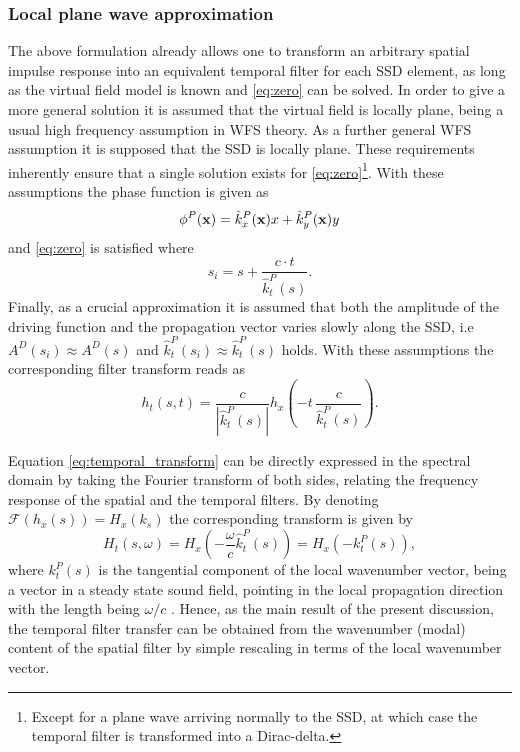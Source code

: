 \documentclass[conference]{IEEEtran}
\begin{document}
\subsubsection{Local plane wave approximation}
The above formulation already allows one to transform an arbitrary spatial impulse response into an equivalent temporal filter for each SSD element, as long as the virtual field model is known and \eqref{eq:zero} can be solved.
In order to give a more general solution it is assumed that the virtual field is locally plane, being a usual high frequency assumption in WFS theory.
As a further general WFS assumption it is supposed that the SSD is locally plane.
These requirements inherently ensure that a single solution exists for \eqref{eq:zero}\footnote{Except for a plane wave arriving normally to the SSD, at which case the temporal filter is transformed into a Dirac-delta.}.
With these assumptions the phase function is given as
\begin{equation}
    \phi^P(\mathbf{x}) = \hat{k}^P_x(\mathbf{x})x +  \hat{k}^P_y(\mathbf{x}) y
\end{equation}
and \eqref{eq:zero} is satisfied where
\begin{equation}
    s_i = s + \frac{c \cdot t}{\hat{k}_t^P(s)}
    .
\end{equation}
Finally, as a crucial approximation it is assumed that both the amplitude of the driving function and the propagation vector varies slowly along the SSD, i.e $A^D(s_i) \approx A^D(s)$ and $\hat{k}_t^P(s_i) \approx \hat{k}_t^P(s)$ holds.
With these assumptions the corresponding filter transform reads as
\begin{equation}
    h_t\left(s,t\right) =\frac{ c }{|\hat{k}_t^P(s)|} h_x\left(-t \,\frac{c}{\hat{k}_t^P(s)}\right).
    \label{eq:temporal_transform}
\end{equation}

Equation \eqref{eq:temporal_transform} can be directly expressed in the spectral domain by taking the Fourier transform of both sides, relating the frequency response of the spatial and the temporal filters.
By denoting $\mathcal{F}\left( h_x(s)\right) = H_x(k_s)$ the corresponding transform is given by
\begin{equation}
    H_t\left(s,\omega\right) = H_x\left(-\frac{\omega}{c}\hat{k}_t^P(s)\right) = H_x\left(-k_t^P(s)\right),
    \label{eq:frequency_transform}
\end{equation}
where $k_t^P(s)$ is the tangential component of the local wavenumber vector, being a vector in a steady state sound field, pointing in the local propagation direction with the length being $\omega/c$ \cite{Firtha2019phd}.
Hence, as the main result of the present discussion, the temporal filter transfer can be obtained from the wavenumber (modal) content of the spatial filter by simple rescaling in terms of the local wavenumber vector.
\end{document}
